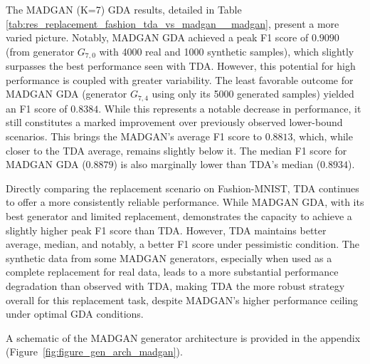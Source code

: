 The MADGAN (K=7) GDA results, detailed in Table \ref{tab:res_replacement_fashion_tda_vs_madgan__madgan}, present a more varied picture. Notably, MADGAN GDA achieved a peak F1 score of $0.9090$ (from generator \(G_{7,0}\) with 4000 real and 1000 synthetic samples), which slightly surpasses the best performance seen with TDA. However, this potential for high performance is coupled with greater variability. The least favorable outcome for MADGAN GDA (generator \(G_{7,4}\) using only its 5000 generated samples) yielded an F1 score of \(0.8384\). While this represents a notable decrease in performance, it still constitutes a marked improvement over previously observed lower-bound scenarios. This brings the MADGAN’s average F1 score to \(0.8813\), which, while closer to the TDA average, remains slightly below it. The median F1 score for MADGAN GDA (\(0.8879\)) is also marginally lower than TDA’s median (\(0.8934\)).

Directly comparing the replacement scenario on Fashion-MNIST, TDA continues to offer a more consistently reliable performance. While MADGAN GDA, with its best generator and limited replacement, demonstrates the capacity to achieve a slightly higher peak F1 score than TDA. However, TDA maintains better average, median, and notably, a better F1 score under pessimistic condition. The synthetic data from some MADGAN generators, especially when used as a complete replacement for real data, leads to a more substantial performance degradation than observed with TDA, making TDA the more robust strategy overall for this replacement task, despite MADGAN's higher performance ceiling under optimal GDA conditions.

A schematic of the MADGAN generator architecture is provided in the appendix (Figure~\ref{fig:figure_gen_arch_madgan}).

